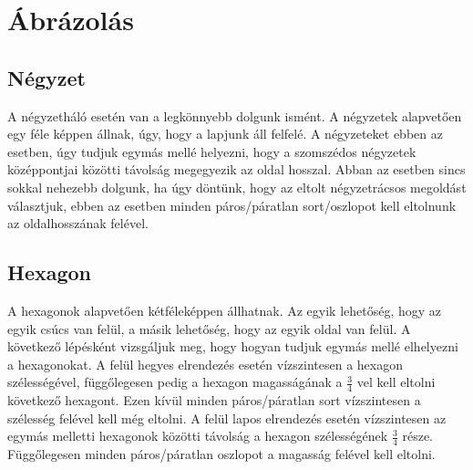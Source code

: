 \chapter{Ábrázolás}

\section{Négyzet}

A négyzetháló esetén van a legkönnyebb dolgunk ismént. A négyzetek alapvetően egy féle képpen állnak, úgy, hogy a lapjunk áll felfelé.  A négyzeteket ebben az esetben, úgy tudjuk egymás mellé helyezni, hogy a szomszédos négyzetek középpontjai közötti távolság megegyezik az oldal hosszal. 
\newline
\newline Abban az esetben sincs sokkal nehezebb dolgunk, ha úgy döntünk, hogy az eltolt négyzetrácsos megoldást választjuk, ebben az esetben minden páros/páratlan sort/oszlopot kell eltolnunk az oldalhosszának felével.

\section{Hexagon}

A hexagonok alapvetően kétféleképpen állhatnak. Az egyik lehetőség, hogy az egyik csúcs van felül, a másik lehetőség, hogy az egyik oldal van felül. 
\newline
\newline A következő lépésként vizsgáljuk meg, hogy hogyan tudjuk egymás mellé elhelyezni a hexagonokat.
\newline
\newline A felül hegyes elrendezés esetén vízszintesen a hexagon szélességével, függőlegesen pedig a hexagon magasságának a $\frac{3}{4}$ vel kell eltolni következő hexagont. Ezen kívül minden páros/páratlan sort vízszintesen a szélesség felével kell még eltolni.
\newline
\newline A felül lapos elrendezés esetén vízszintesen az egymás melletti hexagonok közötti távolság a hexagon szélességének $\frac{3}{4}$ része. Függőlegesen minden páros/páratlan oszlopot a magasság felével kell eltolni.

